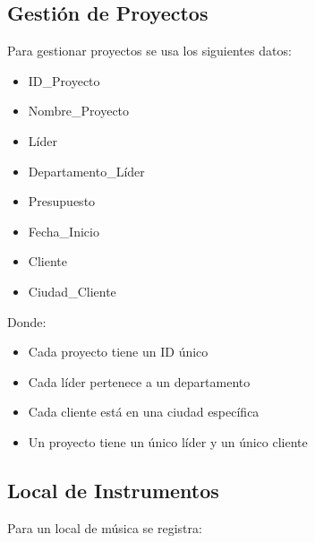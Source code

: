 \documentclass[12pt]{article}
\begin{document}
\subsection{Gestión de Proyectos}
Para gestionar proyectos se usa los siguientes datos:

\vspace{0.5em}

\begin{minipage}[t]{0.48\textwidth}
\begin{itemize}
    \item ID\_Proyecto
    \item Nombre\_Proyecto
    \item Líder
    \item Departamento\_Líder
\end{itemize}
\end{minipage}
\hfill
\begin{minipage}[t]{0.48\textwidth}
\begin{itemize}
    \item Presupuesto
    \item Fecha\_Inicio
    \item Cliente
    \item Ciudad\_Cliente
\end{itemize}
\end{minipage}

\vspace{1em}

Donde:
\begin{itemize}
    \item Cada proyecto tiene un ID único
    \item Cada líder pertenece a un departamento
    \item Cada cliente está en una ciudad específica
    \item Un proyecto tiene un único líder y un único cliente
\end{itemize}

\subsection{Local de Instrumentos}
Para un local de música se registra:

\vspace{0.5em}
\end{document}
